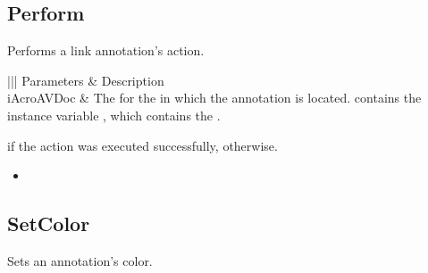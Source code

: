\documentclass[letterpaper,12pt,english,openany,oneside]{sphinxmanual}
\begin{document}
\subsection{Perform}
\label{\detokenize{IAC_API_OLE_Objects:perform}}
Performs a link annotation’s action.


\begin{sphinxVerbatim}[commandchars=\\\{\}]
  
\end{sphinxVerbatim}
\label{\detokenize{IAC_API_OLE_Objects:parameters-40}}


\begin{savenotes}\sphinxattablestart
\centering
{}\label{\detokenize{IAC_API_OLE_Objects:section-45}}\nobreak
\begin{tabular}[t]{|||}
\hline
\sphinxstyletheadfamily 
Parameters
&\sphinxstyletheadfamily 
Description
\\
\hline
iAcroAVDoc
&
The  for the  in which the annotation is located.  contains the instance variable , which contains the .
\\
\hline
\end{tabular}
\par
\sphinxattableend\end{savenotes}


 if the action was executed successfully,  otherwise.

\label{\detokenize{IAC_API_OLE_Objects:related-methods-75}}
\begin{itemize}
\item {} 
 

\end{itemize}




\subsection{SetColor}
\label{\detokenize{IAC_API_OLE_Objects:setcolor}}
Sets an annotation’s color.
\end{document}
